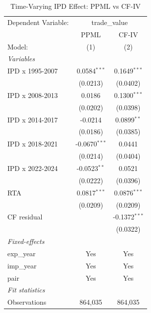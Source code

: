
\begin{table}[htbp]
   \caption{Time-Varying IPD Effect: PPML vs CF-IV}
   \centering
   \begin{tabular}{lcc}
      \tabularnewline \midrule \midrule
      Dependent Variable: & \multicolumn{2}{c}{trade\_value}\\
                          & PPML                  & CF-IV \\   
      Model:              & (1)                   & (2)\\  
      \midrule
      \emph{Variables}\\
      IPD x 1995-2007     & 0.0584$^{***}$        & 0.1649$^{***}$\\   
                          & (0.0213)              & (0.0402)\\   
      IPD x 2008-2013     & 0.0186                & 0.1300$^{***}$\\   
                          & (0.0202)              & (0.0398)\\   
      IPD x 2014-2017     & -0.0214               & 0.0899$^{**}$\\   
                          & (0.0186)              & (0.0385)\\   
      IPD x 2018-2021     & -0.0670$^{***}$       & 0.0441\\   
                          & (0.0214)              & (0.0404)\\   
      IPD x 2022-2024     & -0.0523$^{**}$        & 0.0521\\   
                          & (0.0222)              & (0.0396)\\   
      RTA                 & 0.0817$^{***}$        & 0.0876$^{***}$\\   
                          & (0.0209)              & (0.0209)\\   
      CF residual         &                       & -0.1372$^{***}$\\   
                          &                       & (0.0322)\\   
      \midrule
      \emph{Fixed-effects}\\
      exp\_year           & Yes                   & Yes\\  
      imp\_year           & Yes                   & Yes\\  
      pair                & Yes                   & Yes\\  
      \midrule
      \emph{Fit statistics}\\
      Observations        & 864,035               & 864,035\\  

\end{tabular}
\end{table}
